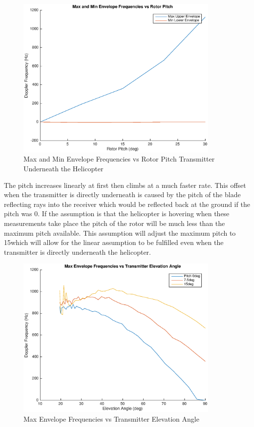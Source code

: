 \begin{figure}
	\begin{center}
		\includegraphics[width=10cm]{images/simulation/pitch_0txPos_max_doppler.eps}
		\caption{Max and Min Envelope Frequencies vs Rotor Pitch Transmitter Underneath the Helicopter}
		\label{fig:pitch_tx0}
	\end{center}
\end{figure}

The pitch increases linearly at first then climbs at a much faster rate. This offset when the transmitter is directly underneath is caused by the pitch of the blade reflecting rays into the receiver which would be reflected back at the ground if the pitch was 0\textdegree. If the assumption is that the helicopter is hovering when these measurements take place the pitch of the rotor will be much less than the maximum pitch available. This assumption will adjust the maximum pitch to 15\textdegree \space which will allow for the linear assumption to be fulfilled even when the transmitter is directly underneath the helicopter.

\begin{figure}
	\begin{center}
		\includegraphics[width=10cm]{images/simulation/elevation_angle_with_pitch_max_doppler.eps}
		\caption{Max Envelope Frequencies vs Transmitter Elevation Angle}
		\label{fig:pitch_tx_elevation_angle}
	\end{center}
\end{figure}

